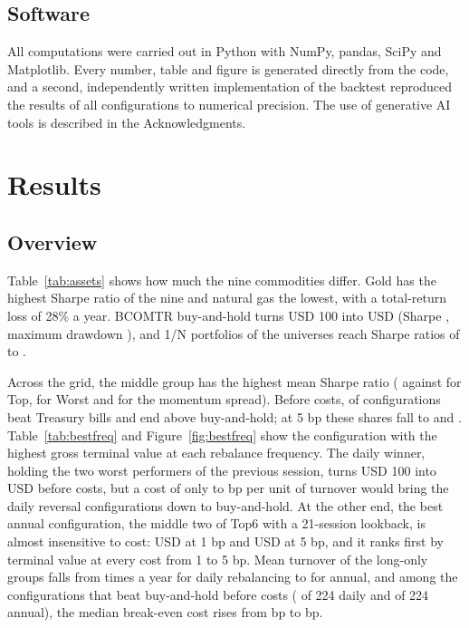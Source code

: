 \documentclass[commodities,article,submit,pdftex,moreauthors]{Definitions/mdpi}
\begin{document}
\subsection{Software}

All computations were carried out in Python with NumPy, pandas, SciPy and Matplotlib. Every number, table and figure is generated directly from the code, and a second, independently written implementation of the backtest reproduced the results of all \nConfigs{} configurations to numerical precision. The use of generative AI tools is described in the Acknowledgments.

\section{Results}\label{sec:results}

\subsection{Overview}

Table~\ref{tab:assets} shows how much the nine commodities differ. Gold has the highest Sharpe ratio of the nine and natural gas the lowest, with a total-return loss of 28\% a year. BCOMTR buy-and-hold turns USD 100 into USD \bhFinal{} (Sharpe \bhSharpe, maximum drawdown \bhMdd), and 1/N portfolios of the universes reach Sharpe ratios of \ewSrLo{} to \ewSrHi.

Across the grid, the middle group has the highest mean Sharpe ratio (\srMedMean{} against \srTopMean{} for Top, \srWorMean{} for Worst and \srTmwMean{} for the momentum spread). Before costs, \beatTbillA{} of configurations beat Treasury bills and \beatBhA{} end above buy-and-hold; at 5 bp these shares fall to \beatTbillD{} and \beatBhD. Table~\ref{tab:bestfreq} and Figure~\ref{fig:bestfreq} show the configuration with the highest gross terminal value at each rebalance frequency. The daily winner, holding the two worst performers of the previous session, turns USD 100 into USD \bestFinalGross{} before costs, but a cost of only \revBeBhLo{} to \revBeBhHi{} bp per unit of turnover would bring the daily reversal configurations down to buy-and-hold. At the other end, the best annual configuration, the middle two of Top6 with a 21-session lookback, is almost insensitive to cost: USD \bestFinalNetA{} at 1 bp and USD \bestFinalNetC{} at 5 bp, and it ranks first by terminal value at every cost from 1 to 5 bp. Mean turnover of the long-only groups falls from \turnDaily{} times a year for daily rebalancing to \turnAnnual{} for annual, and among the configurations that beat buy-and-hold before costs (\nBeatDaily{} of 224 daily and \nBeatAnnual{} of 224 annual), the median break-even cost rises from \beMedDaily{} bp to \beMedAnnual{} bp.
\end{document}
